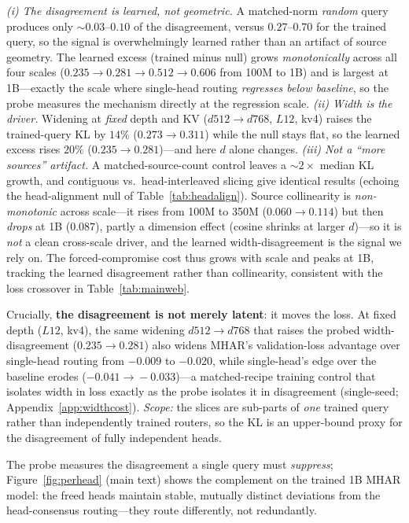\documentclass{article}
\begin{document}
\emph{(i) The disagreement is learned, not geometric.} A matched-norm \emph{random}
query produces only $\sim\!0.03$--$0.10$ of the disagreement, versus $0.27$--$0.70$
for the trained query, so the signal is overwhelmingly learned rather than an
artifact of source geometry. The learned excess (trained minus null) grows
\emph{monotonically} across all four scales ($0.235\to0.281\to0.512\to0.606$ from
100M to 1B) and is largest at 1B---exactly the scale where single-head routing
\emph{regresses below baseline}, so the probe measures the mechanism directly at the
regression scale. \emph{(ii) Width is the driver.} Widening at \emph{fixed} depth
and KV ($d512\to d768$, $L12$, kv4) raises the trained-query KL by $14\%$
($0.273\to0.311$) while the null stays flat, so the learned excess rises $20\%$
($0.235\to0.281$)---and here $d$ alone changes. \emph{(iii) Not a ``more sources''
artifact.} A matched-source-count control leaves a $\sim\!2\times$ median KL growth,
and contiguous vs.\ head-interleaved slicing give identical results (echoing the
head-alignment null of Table~\ref{tab:headalign}). Source collinearity is \emph{non-monotonic} across scale---it rises from 100M to
350M ($0.060\!\to\!0.114$) but then \emph{drops} at 1B ($0.087$), partly a
dimension effect (cosine shrinks at larger $d$)---so it is \emph{not} a clean
cross-scale driver, and the learned width-disagreement is the signal we rely on.
The forced-compromise cost thus grows with scale and peaks at 1B, tracking the
learned disagreement rather than collinearity, consistent with the loss crossover
in Table~\ref{tab:mainweb}.

Crucially, \textbf{the disagreement is not merely latent}: it moves the loss. At
fixed depth ($L12$, kv4), the same widening $d512\!\to\!d768$ that raises the probed
width-disagreement ($0.235\!\to\!0.281$) also widens MHAR's validation-loss
advantage over single-head routing from $-0.009$ to $-0.020$, while single-head's
edge over the baseline erodes ($-0.041\!\to\!-0.033$)---a matched-recipe training
control that isolates width in loss exactly as the probe isolates it in
disagreement (single-seed; Appendix~\ref{app:widthcost}). \emph{Scope:} the slices
are sub-parts of \emph{one} trained query rather than independently trained routers,
so the KL is an upper-bound proxy for the disagreement of fully independent heads.

The probe measures the disagreement a single query must \emph{suppress};
Figure~\ref{fig:perhead} (main text) shows the complement on the trained 1B MHAR
model: the freed heads maintain stable, mutually distinct deviations from the
head-consensus routing---they route differently, not redundantly.
\end{document}
